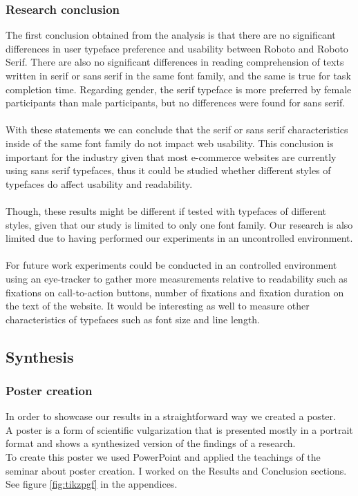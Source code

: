 \documentclass{article}
\begin{document}
\subsubsection{Research conclusion}
The first conclusion obtained from the analysis is that there are no significant differences in user typeface preference and usability between Roboto and Roboto Serif. There are also no significant differences in reading comprehension of texts written in serif or sans serif in the same font family, and the same is true for task completion time. Regarding gender, the serif typeface is more preferred by female participants than male participants, but no differences were found for sans serif.
\\\\
With these statements we can conclude that the serif or sans serif characteristics inside of the same font family do not impact web usability. This conclusion is important for the industry given that most e-commerce websites are currently using sans serif typefaces, thus it could be studied whether different styles of typefaces do affect usability and readability.
\\\\
Though, these results might be different if tested with typefaces of different styles, given that our study is limited to only one font family. Our research is also limited due to having performed our experiments in an uncontrolled environment.
\\\\
For future work experiments could be conducted in an controlled environment using an eye-tracker to gather more measurements relative to readability such as fixations on call-to-action buttons, number of fixations and fixation duration on the text of the website. It would be interesting as well to measure other characteristics of typefaces such as font size and line length.

\subsection{Synthesis}
\subsubsection{Poster creation}
In order to showcase our results in a straightforward way we created a poster.
\\
A poster is a form of scientific vulgarization that is presented mostly in a portrait format and shows a synthesized version of the findings of a research.
\\
To create this poster we used PowerPoint and applied the teachings of the seminar about poster creation.
I worked on the Results and Conclusion sections.
\\
See figure \ref{fig:tikzpgf} in the appendices.
\end{document}
